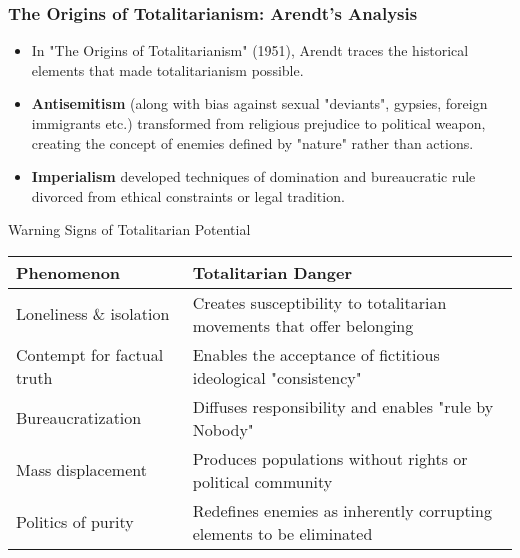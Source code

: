 \documentclass{beamer}
\begin{document}
\begin{frame}
    \frametitle{The Origins of Totalitarianism: Arendt's Analysis}
    \small
    \begin{itemize}
        \item In "The Origins of Totalitarianism" (1951), Arendt traces the historical elements that made totalitarianism possible.
        \item \textbf{Antisemitism} (along with bias against sexual "deviants", gypsies, foreign immigrants etc.) transformed from religious prejudice to political weapon, creating the concept of enemies defined by "nature" rather than actions.
        \item \textbf{Imperialism} developed techniques of domination and bureaucratic rule divorced from ethical constraints or legal tradition.
    \end{itemize}
    
    \begin{alertblock}{Warning Signs of Totalitarian Potential}
    \scriptsize
    \begin{tabular}{p{3.5cm}p{7cm}}
    \textbf{Phenomenon} & \textbf{Totalitarian Danger} \\
    \hline
    Loneliness \& isolation & Creates susceptibility to totalitarian movements that offer belonging \\
    Contempt for factual truth & Enables the acceptance of fictitious ideological "consistency" \\
    Bureaucratization & Diffuses responsibility and enables "rule by Nobody" \\
    Mass displacement & Produces populations without rights or political community \\
    Politics of purity & Redefines enemies as inherently corrupting elements to be eliminated \\
    \end{tabular}
    \end{alertblock}
    \end{frame}
\end{document}
